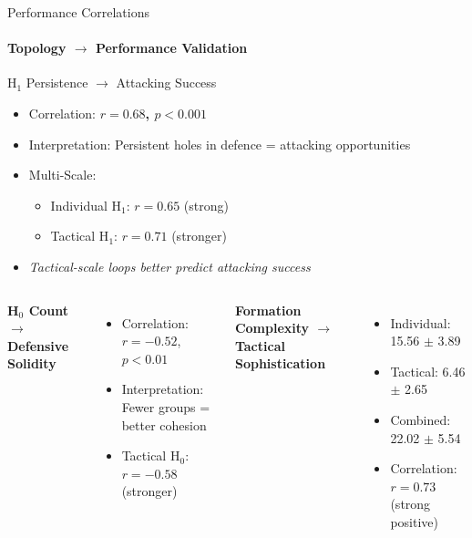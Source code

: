 \documentclass[aspectratio=169]{beamer}
\newcommand{\highlight}[1]{\textcolor{accentorange}{\textbf{#1}}}
\begin{document}
\begin{frame}{Performance Correlations}
\framesubtitle{Topology $\rightarrow$ Performance Validation}

\begin{block}{H$_1$ Persistence $\rightarrow$ Attacking Success}
\begin{itemize}
    \item Correlation: \highlight{$r = 0.68$, $p < 0.001$}
    \item Interpretation: Persistent holes in defence = attacking opportunities
    \item Multi-Scale:
    \begin{itemize}
        \item Individual H$_1$: $r = 0.65$ (strong)
        \item Tactical H$_1$: $r = 0.71$ (stronger)
    \end{itemize}
    \item \textit{Tactical-scale loops better predict attacking success}
\end{itemize}
\end{block}

\begin{columns}[T]
\textbf{H$_0$ Count $\rightarrow$ Defensive Solidity}
\begin{itemize}
    \item Correlation: $r = -0.52$, $p < 0.01$
    \item Interpretation: Fewer groups = better cohesion
    \item Tactical H$_0$: $r = -0.58$ (stronger)
\end{itemize}

\textbf{Formation Complexity $\rightarrow$ Tactical Sophistication}
\begin{itemize}
    \item Individual: 15.56 $\pm$ 3.89
    \item Tactical: 6.46 $\pm$ 2.65
    \item Combined: 22.02 $\pm$ 5.54
    \item Correlation: \highlight{$r = 0.73$} (strong positive)
\end{itemize}
\end{columns}
\end{frame}
\end{document}
